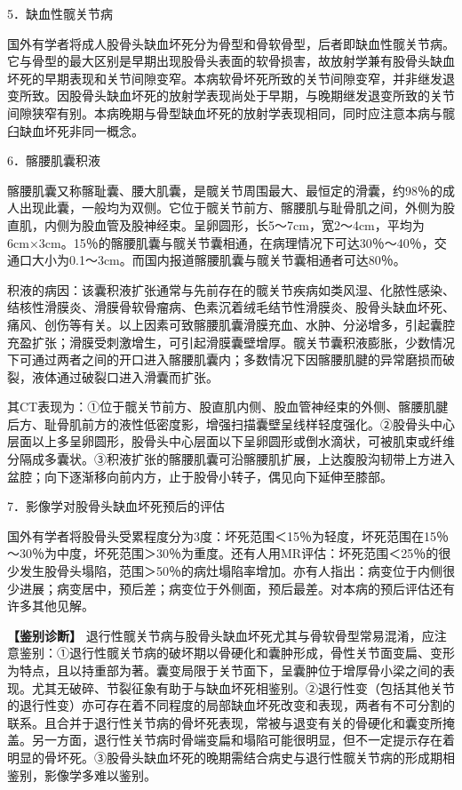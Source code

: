 5．缺血性髋关节病

国外有学者将成人股骨头缺血坏死分为骨型和骨软骨型，后者即缺血性髋关节病。它与骨型的最大区别是早期出现股骨头表面的软骨损害，故放射学兼有股骨头缺血坏死的早期表现和关节间隙变窄。本病软骨坏死所致的关节间隙变窄，并非继发退变所致。因股骨头缺血坏死的放射学表现尚处于早期，与晚期继发退变所致的关节间隙狭窄有别。本病晚期与骨型缺血坏死的放射学表现相同，同时应注意本病与髋臼缺血坏死非同一概念。

6．髂腰肌囊积液

髂腰肌囊又称髂耻囊、腰大肌囊，是髋关节周围最大、最恒定的滑囊，约98％的成人出现此囊，一般均为双侧。它位于髋关节前方、髂腰肌与耻骨肌之间，外侧为股直肌，内侧为股血管及股神经束。呈卵圆形，长5～7cm，宽2～4cm，平均为6cm×3cm。15％的髂腰肌囊与髋关节囊相通，在病理情况下可达30％～40％，交通口大小为0.1～3cm。而国内报道髂腰肌囊与髋关节囊相通者可达80％。

积液的病因：该囊积液扩张通常与先前存在的髋关节疾病如类风湿、化脓性感染、结核性滑膜炎、滑膜骨软骨瘤病、色素沉着绒毛结节性滑膜炎、股骨头缺血坏死、痛风、创伤等有关。以上因素可致髂腰肌囊滑膜充血、水肿、分泌增多，引起囊腔充盈扩张；滑膜受刺激增生，可引起滑膜囊壁增厚。髋关节囊积液膨胀，少数情况下可通过两者之间的开口进入髂腰肌囊内；多数情况下因髂腰肌腱的异常磨损而破裂，液体通过破裂口进入滑囊而扩张。

其CT表现为：①位于髋关节前方、股直肌内侧、股血管神经束的外侧、髂腰肌腱后方、耻骨肌前方的液性低密度影，增强扫描囊壁呈线样轻度强化。②股骨头中心层面以上多呈卵圆形，股骨头中心层面以下呈卵圆形或倒水滴状，可被肌束或纤维分隔成多囊状。③积液扩张的髂腰肌囊可沿髂腰肌扩展，上达腹股沟韧带上方进入盆腔；向下逐渐移向前内方，止于股骨小转子，偶见向下延伸至膝部。

7．影像学对股骨头缺血坏死预后的评估

国外有学者将股骨头受累程度分为3度：坏死范围＜15％为轻度，坏死范围在15％～30％为中度，坏死范围＞30％为重度。还有人用MR评估：坏死范围＜25％的很少发生股骨头塌陷，范围＞50％的病灶塌陷率增加。亦有人指出：病变位于内侧很少进展；病变居中，预后差；病变位于外侧面，预后最差。对本病的预后评估还有许多其他见解。

\textbf{【鉴别诊断】}
退行性髋关节病与股骨头缺血坏死尤其与骨软骨型常易混淆，应注意鉴别：①退行性髋关节病的破坏期以骨硬化和囊肿形成，骨性关节面变扁、变形为特点，且以持重部为著。囊变局限于关节面下，呈囊肿位于增厚骨小梁之间的表现。尤其无破碎、节裂征象有助于与缺血坏死相鉴别。②退行性变（包括其他关节的退行性变）亦可存在着不同程度的局部缺血坏死改变和表现，两者有不可分割的联系。且合并于退行性关节病的骨坏死表现，常被与退变有关的骨硬化和囊变所掩盖。另一方面，退行性关节病时骨端变扁和塌陷可能很明显，但不一定提示存在着明显的骨坏死。③股骨头缺血坏死的晚期需结合病史与退行性髋关节病的形成期相鉴别，影像学多难以鉴别。

